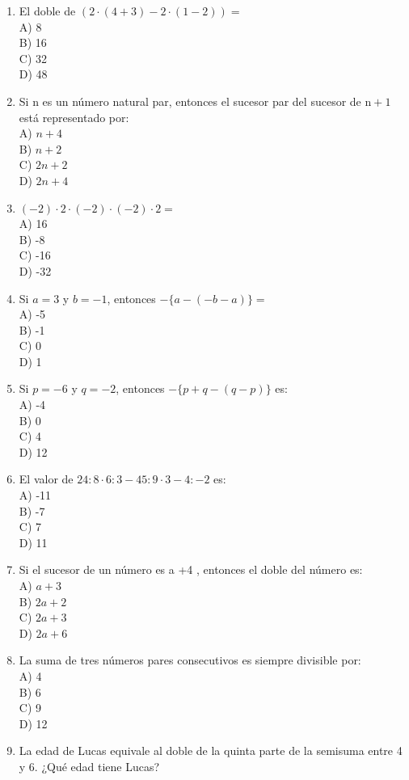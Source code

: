 \documentclass[10pt]{article}
\begin{document}
\begin{enumerate}
A) 9\\
B) -5\\
C) -9\\
D) 5
  \item El doble de $(2 \cdot(4+3)-2 \cdot(1-2))=$\\
A) 8\\
B) 16\\
C) 32\\
D) 48
  \item Si n es un número natural par, entonces el sucesor par del sucesor de $\mathrm{n}+1$ está representado por:\\
A) $n+4$\\
B) $n+2$\\
C) $2 n+2$\\
D) $2 n+4$
  \item $(-2) \cdot 2 \cdot(-2) \cdot(-2) \cdot 2=$\\
A) 16\\
B) -8\\
C) -16\\
D) -32
  \item Si $a=3$ y $b=-1$, entonces $-\{a-(-b-a)\}=$\\
A) -5\\
B) -1\\
C) 0\\
D) 1
  \item Si $p=-6$ y $q=-2$, entonces $-\{p+q-(q-p)\}$ es:\\
A) -4\\
B) 0\\
C) 4\\
D) 12
  \item El valor de $24: 8 \cdot 6: 3-45: 9 \cdot 3-4:-2$ es:\\
A) -11\\
B) -7\\
C) 7\\
D) 11
  \item Si el sucesor de un número es a +4 , entonces el doble del número es:\\
A) $a+3$\\
B) $2 a+2$\\
C) $2 a+3$\\
D) $2 a+6$
  \item La suma de tres números pares consecutivos es siempre divisible por:\\
A) 4\\
B) 6\\
C) 9\\
D) 12
  \item La edad de Lucas equivale al doble de la quinta parte de la semisuma entre 4 y 6. ¿Qué edad tiene Lucas?\\

\end{enumerate}
\end{document}
